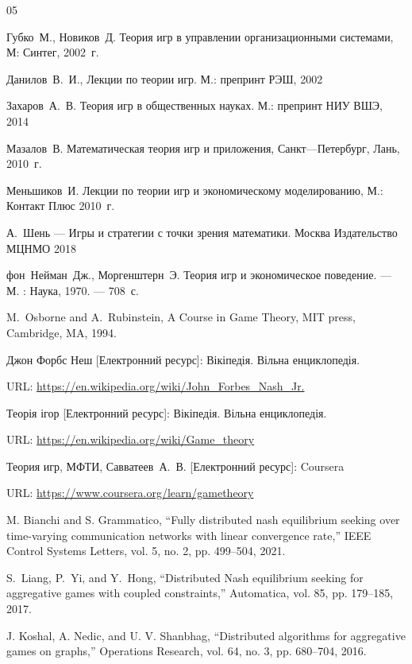 \documentclass[a4paper]{article}
\begin{document}
\clearpage
\begin{thebibliography}{05}
{\small

 Губко~М., Новиков~Д. Теория игр в управлении организационными системами, М: Синтег, 2002~г.

 Данилов~В.~И., Лекции по теории игр. М.: препринт РЭШ, 2002

 Захаров~А.~В. Теория игр в общественных науках. М.: препринт НИУ ВШЭ, 2014

 Мазалов~В. Математическая теория игр и приложения, Санкт—Петербург, Лань, 2010~г.

 Меньшиков~И. Лекции по теории игр и экономическому моделированию, М.: Контакт Плюс 2010~г.

 А.~Шень — Игры и стратегии с точки зрения математики. Москва
Издательство МЦНМО 2018

 фон~Нейман~Дж., Моргенштерн~Э. Теория игр и экономическое поведение. — М. : Наука, 1970. — 708~с.

 M.~Osborne and A.~Rubinstein, A Course in Game Theory, MIT press, Cambridge, MA, 1994.

 Джон Форбс Неш [Електронний ресурс]: Вікіпедія. Вільна енциклопедія.

URL: \url{https://en.wikipedia.org/wiki/John_Forbes_Nash_Jr.}

 Теорія ігор [Електронний ресурс]: Вікіпедія. Вільна енциклопедія.

URL: \url{https://en.wikipedia.org/wiki/Game_theory}

 Теория игр, МФТИ, Савватеев~А.~В. [Електронний ресурс]: Coursera

URL: \url{https://www.coursera.org/learn/gametheory}

 M. Bianchi and S. Grammatico, “Fully distributed nash equilibrium seeking over time-varying communication networks with linear convergence rate,” IEEE Control Systems Letters, vol. 5, no. 2, pp. 499–504, 2021.

\label{Cite22} S.~Liang, P.~Yi, and Y.~Hong, “Distributed Nash equilibrium seeking for aggregative games with coupled constraints,” Automatica, vol. 85, pp. 179–185, 2017.

 J. Koshal, A. Nedic, and U. V. Shanbhag, “Distributed algorithms for aggregative games on graphs,” Operations Research, vol. 64, no. 3, pp. 680–704, 2016.

}
\end{thebibliography}
\end{document}
